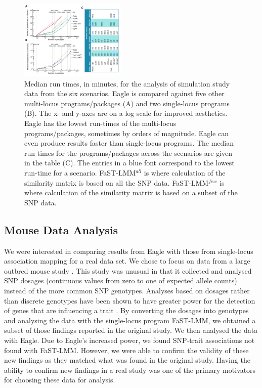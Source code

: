\documentclass{bioinfo}
\begin{document}
 
\begin{figure}[!tpb]
 \centerline{\includegraphics[width=0.45\textwidth,natwidth=610,natheight=642]{Figure2_time.jpg}}
 \caption{
Median run times, in minutes, for the analysis of simulation study data from the six scenarios. Eagle is compared against five other multi-locus programs/packages (A) and two single-locus programs (B). The x- and y-axes are on a log scale for improved aesthetics. Eagle has the lowest run-times of the multi-locus programs/packages, sometimes by orders of magnitude. Eagle can even produce results faster than single-locus programs. The median run times for the programs/packages across the scenarios are given in the table (C). The entries in a blue font  correspond to the lowest run-time for a scenario. FaST-LMM$^{all}$ is where calculation of the similarity matrix is based on all the SNP data.  
 FaST-LMM$^{few}$ is where calculation  of the similarity matrix is based on a subset of the SNP data. }
\label{fig_time}
\end{figure}

 





\subsection{Mouse Data Analysis}


We were interested in comparing results from Eagle with those from single-locus association mapping for a real data set.
 We chose to focus on data from a large outbred mouse study \citep{nicod2016genome}. This study was unusual in that it collected and analysed SNP dosages (continuous values from zero to one of expected allele counts)  instead of the more common SNP genotypes. Analyses based on dosages rather than discrete genotypes have been shown to have greater power for the detection of genes that are influencing a trait  \citep{zheng2011comparison}. By converting the dosages into genotypes and analysing the data with the single-locus program FaST-LMM, we obtained a subset of those findings reported in the original study. We then analysed the data with Eagle. Due to Eagle's increased power, we found SNP-trait associations not found with  FaST-LMM. However, we were 
 able to confirm the validity of these new findings as they matched what was found in the original study. Having the ability to confirm new findings  in a real study was 
 one of the primary motivators for choosing these data for analysis. 
\end{document}
